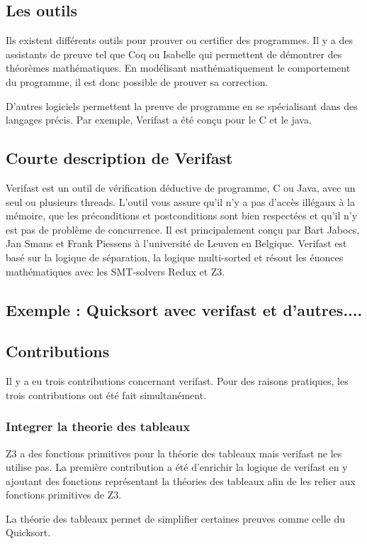 \documentclass[9pt]{book}
\begin{document}
		\subsection{Les outils}
		Ils existent diff\'erents outils pour prouver ou certifier des programmes. Il y a des assistants de preuve tel que Coq ou Isabelle qui permettent de d\'emontrer des th\'eor\`emes math\'ematiques. En mod\'elisant math\'ematiquement le comportement du programme, il est donc possible de prouver sa correction. \par
	D'autres logiciels permettent la preuve de programme en se sp\'ecialisant dans des langages pr\'ecis. Par exemple, Verifast a \'et\'e con\c{c}u pour le C et le java.	
		\subsection{Courte description de Verifast}
			Verifast est un outil de v\'erification d\'eductive de programme, C ou Java, avec un seul ou plusieurs threads. L'outil vous assure qu'il n'y a pas d'acc\`es ill\'egaux \`a la m\'emoire, que les pr\'econditions et postconditions sont bien respect\'ees et qu'il n'y est pas de probl\`eme de concurrence. Il est principalement con\c{c}u par Bart Jabocs, Jan Smans et Frank Piessens \`a l'universit\'e de Leuven en Belgique. Verifast est bas\'e sur la logique de s\'eparation, la logique multi-sorted et r\'esout les \'enonces math\'ematiques avec les SMT-solvers Redux et Z3.
		\subsection{Exemple : Quicksort avec verifast et d'autres....}
		\subsection{Contributions}
		Il y a eu trois contributions concernant verifast. Pour des raisons pratiques, les trois contributions ont \'et\'e fait simultan\'ement.
			\subsubsection{Integrer la theorie des tableaux}
				Z3 a des fonctions primitives pour la th\'eorie des tableaux mais verifast ne les utilise pas. La premi\`ere contribution a \'et\'e d'enrichir la logique de verifast en y ajoutant des fonctions repr\'esentant la th\'eories des tableaux afin de les relier aux fonctions primitives de Z3. \par
				La th\'eorie des tableaux permet de simplifier certaines preuves comme celle du Quicksort.
\end{document}
